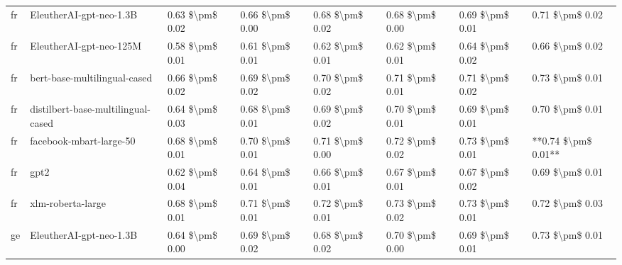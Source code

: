 \begin{tabular}{llllllll}
      fr &            EleutherAI-gpt-neo-1.3B & 0.63 \$\textbackslash pm\$ 0.02 &           0.66 \$\textbackslash pm\$ 0.00 &       0.68 \$\textbackslash pm\$ 0.02 &        0.68 \$\textbackslash pm\$ 0.00 &                         0.69 \$\textbackslash pm\$ 0.01 &     0.71 \$\textbackslash pm\$ 0.02 \\
      fr &            EleutherAI-gpt-neo-125M & 0.58 \$\textbackslash pm\$ 0.01 &           0.61 \$\textbackslash pm\$ 0.01 &       0.62 \$\textbackslash pm\$ 0.01 &        0.62 \$\textbackslash pm\$ 0.01 &                         0.64 \$\textbackslash pm\$ 0.02 &     0.66 \$\textbackslash pm\$ 0.02 \\
      fr &       bert-base-multilingual-cased & 0.66 \$\textbackslash pm\$ 0.02 &           0.69 \$\textbackslash pm\$ 0.02 &       0.70 \$\textbackslash pm\$ 0.02 &        0.71 \$\textbackslash pm\$ 0.01 &                         0.71 \$\textbackslash pm\$ 0.02 &     0.73 \$\textbackslash pm\$ 0.01 \\
      fr & distilbert-base-multilingual-cased & 0.64 \$\textbackslash pm\$ 0.03 &           0.68 \$\textbackslash pm\$ 0.01 &       0.69 \$\textbackslash pm\$ 0.02 &        0.70 \$\textbackslash pm\$ 0.01 &                         0.69 \$\textbackslash pm\$ 0.01 &     0.70 \$\textbackslash pm\$ 0.01 \\
      fr &            facebook-mbart-large-50 & 0.68 \$\textbackslash pm\$ 0.01 &           0.70 \$\textbackslash pm\$ 0.01 &       0.71 \$\textbackslash pm\$ 0.00 &        0.72 \$\textbackslash pm\$ 0.02 &                         0.73 \$\textbackslash pm\$ 0.01 & **0.74 \$\textbackslash pm\$ 0.01** \\
      fr &                               gpt2 & 0.62 \$\textbackslash pm\$ 0.04 &           0.64 \$\textbackslash pm\$ 0.01 &       0.66 \$\textbackslash pm\$ 0.01 &        0.67 \$\textbackslash pm\$ 0.01 &                         0.67 \$\textbackslash pm\$ 0.02 &     0.69 \$\textbackslash pm\$ 0.01 \\
      fr &                  xlm-roberta-large & 0.68 \$\textbackslash pm\$ 0.01 &           0.71 \$\textbackslash pm\$ 0.01 &       0.72 \$\textbackslash pm\$ 0.01 &        0.73 \$\textbackslash pm\$ 0.02 &                         0.73 \$\textbackslash pm\$ 0.01 &     0.72 \$\textbackslash pm\$ 0.03 \\
      ge &            EleutherAI-gpt-neo-1.3B & 0.64 \$\textbackslash pm\$ 0.00 &           0.69 \$\textbackslash pm\$ 0.02 &       0.68 \$\textbackslash pm\$ 0.02 &        0.70 \$\textbackslash pm\$ 0.00 &                         0.69 \$\textbackslash pm\$ 0.01 &     0.73 \$\textbackslash pm\$ 0.01 \\

\end{tabular}
